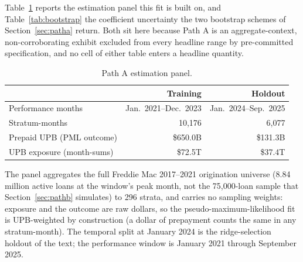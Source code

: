 \documentclass[12pt]{article}
\begin{document}
Table~\ref{tab:panel} reports the estimation panel this fit is built on, and Table~\ref{tab:bootstrap} the coefficient uncertainty the two bootstrap schemes of Section~\ref{sec:patha} return. Both sit here because Path A is an aggregate-context, non-corroborating exhibit excluded from every headline range by pre-committed specification, and no cell of either table enters a headline quantity.

\begin{table}[H]
\centering
\small
\begin{threeparttable}
\caption{Path A estimation panel.}
\label{tab:panel}
\begin{tabular}{@{}lrr@{}}
\toprule
 & Training & Holdout \\
\midrule
Performance months & Jan.\ 2021--Dec.\ 2023 & Jan.\ 2024--Sep.\ 2025 \\
Stratum-months & 10,176 & 6,077 \\
Prepaid UPB (PML outcome) & \$650.0B & \$131.3B \\
UPB exposure (month-sums) & \$72.5T & \$37.4T \\
\bottomrule
\end{tabular}
\begin{tablenotes}[flushleft]\footnotesize
\item The panel aggregates the full Freddie Mac 2017--2021 origination universe (8.84 million active loans at the window's peak month, not the 75,000-loan sample that Section~\ref{sec:pathb} simulates) to 296 strata, and carries no sampling weights: exposure and the outcome are raw dollars, so the pseudo-maximum-likelihood fit is UPB-weighted by construction (a dollar of prepayment counts the same in any stratum-month). The temporal split at January 2024 is the ridge-selection holdout of the text; the performance window is January 2021 through September 2025.
\end{tablenotes}
\end{threeparttable}
\end{table}
\end{document}
